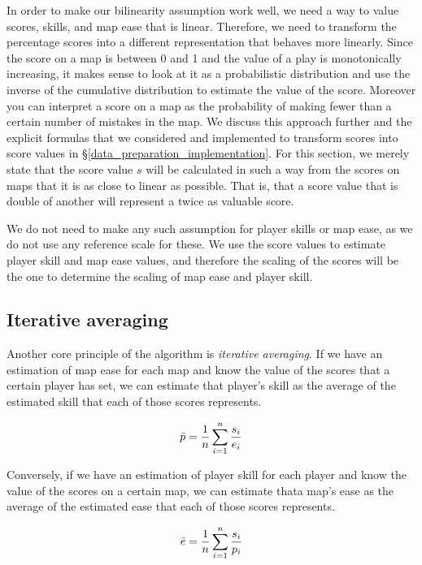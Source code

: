 \documentclass[12pt,a4paper]{article}
\begin{document}
In order to make our bilinearity assumption work well, we need a way to value scores, skills, and map ease that is linear. Therefore, we need to transform the percentage scores into a different representation that behaves more linearly. Since the score on a map is between 0 and 1 and the value of a play is monotonically increasing, it makes sense to look at it as a probabilistic distribution and use the inverse of the cumulative distribution to estimate the value of the score. Moreover you can interpret a score on a map as the probability of making fewer than a certain number of mistakes in the map. We discuss this approach further and the explicit formulas that we considered and implemented to transform scores into score values in \S \ref{data_preparation_implementation}. For this section, we merely state that the score value $s$ will be calculated in such a way from the scores on maps that it is as close to linear as possible. That is, that a score value that is double of another will represent a twice as valuable score.

We do not need to make any such assumption for player skills or map ease, as we do not use any reference scale for these. We use the score values to estimate player skill and map ease values, and therefore the scaling of the scores will be the one to determine the scaling of map ease and player skill.\\

\subsection{Iterative averaging}

Another core principle of the algorithm is {\emph{iterative averaging}}. If we have an estimation of map ease for each map and know the value of the scores that a certain player has set, we can estimate that player's skill as the average of the estimated skill that each of those scores represents.

\begin{equation}
\label{player_skill_averaging}
\bar{p}  = {{1} \over {n}} \sum\limits_{i = 1}^{n} {{s_i} \over {e_i}}
\end{equation}

Conversely, if we have an estimation of player skill for each player and know the value of the scores on a certain map, we can estimate thata map's ease as the average of the estimated ease that each of those scores represents.

\begin{equation}
\label{map_ease_averaging}
\bar{e}  = {{1} \over {n}} \sum\limits_{i = 1}^{n} {{s_i} \over {p_i}}
\end{equation}
\end{document}
